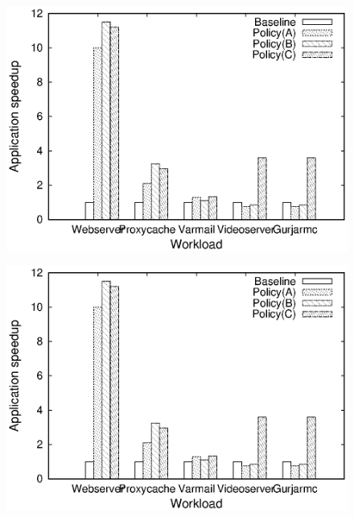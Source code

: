 \documentclass[a4paper, 10pt]{report}
\begin{document}
\begin{figure}
\centering
\includegraphics[width=\columnwidth]{speedup.eps}
 \label{fig:figr5}
\end{figure}


\begin{figure}
\centering
\includegraphics[width=\columnwidth]{speedup.eps}
 \label{fig:figr6}
\end{figure}
\end{document}
